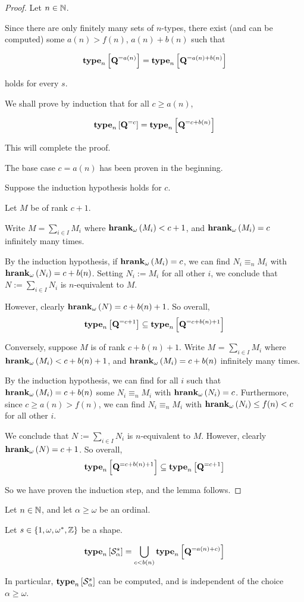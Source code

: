 \begin{proof}
  Let $n \in \mathbb{N}$.

  Since there are only finitely many sets of $n$-types,
  there exist (and can be computed)
  some $a(n) > f(n)$, $a(n) + b(n)$ such that

  \[\mathbf{type}_{n} \left[ {\mathbf{Q}^{= a(n)}} \right] = \mathbf{type}_{n} \left[ {\mathbf{Q}^{= a(n) + b(n)}} \right]\]

  holds for every $s$.

  We shall prove by induction that for all $c \ge a(n)$,

  \[\mathbf{type}_{n} \left[ {\mathbf{Q}^{= c}} \right] = \mathbf{type}_{n} \left[ {\mathbf{Q}^{= c + b(n)}} \right]\]

  This will complete the proof.

  The base case $c = a(n)$ has been proven in the beginning.

  Suppose the induction hypothesis holds for $c$.

  Let $M$ be of rank $c + 1$.

  Write $M = \sum_{i \in I} M_i$ where $\mathbf{hrank}_{\omega}\left( M_i \right) < c + 1$,
  and $\mathbf{hrank}_{\omega}\left( M_i \right) = c$ infinitely many times.

  By the induction hypothesis,
  if $\mathbf{hrank}_{\omega}\left( M_i \right) = c$, we can find $N_i \equiv_n M_i$ with $\mathbf{hrank}_{\omega}\left( N_i \right) = c + b(n)$.
  Setting $N_i := M_i$ for all other $i$, we conclude that $N := \sum_{i \in I} N_i$
  is $n$-equivalent to $M$.

  However, clearly $\mathbf{hrank}_{\omega}\left( N \right) = c + b(n) + 1$. So overall,
  \[\mathbf{type}_{n} \left[ {\mathbf{Q}^{= c + 1}} \right] \subseteq \mathbf{type}_{n} \left[ {\mathbf{Q}^{= c + b(n) + 1}} \right]\]

  Conversely, suppose $M$ is of rank $c + b(n) + 1$.
  Write $M$ = $\sum_{i \in I} M_i$ where $\mathbf{hrank}_{\omega}\left( M_i \right) < c + b(n) + 1$,
  and $\mathbf{hrank}_{\omega}\left( M_i \right) = c + b(n)$ infinitely many times.

  By the induction hypothesis,
  we can find for all $i$ such that $\mathbf{hrank}_{\omega}\left( M_i \right) = c + b(n)$ some
  $N_i \equiv_n M_i$ with $\mathbf{hrank}_{\omega}\left( N_i \right) = c$.
  Furthermore, since $c \ge a(n) > f(n)$, we can
  find $N_i \equiv_n M_i$ with $\mathbf{hrank}_{\omega}\left( N_i \right) \le f(n) < c$ for all other $i$.

  We conclude that $N := \sum_{i \in I} N_i$ is $n$-equivalent to $M$.
  However, clearly $\mathbf{hrank}_{\omega}\left( N \right) = c + 1$. So overall,
  \[\mathbf{type}_{n} \left[ {\mathbf{Q}^{= c + b(n) + 1}} \right] \subseteq \mathbf{type}_{n} \left[ {\mathbf{Q}^{= c + 1}} \right]\]

  So we have proven the induction step, and the lemma follows.
\end{proof}

\begin{lemma}
  Let $n \in \mathbb{N}$, and let $\alpha \ge \omega$ be an ordinal.

  Let $s \in \left\{ {1, \omega, \omega^\ast, \mathbb{Z}} \right\}$ be a shape.

  \[\mathbf{type}_{n} \left[ {\mathcal{S}^{s}_{\alpha}} \right] = \bigcup_{c < b(n)}{\mathbf{type}_{n} \left[ {\mathbf{Q}^{= a(n) + c)}} \right]}\]

  In particular, $\mathbf{type}_{n} \left[ {\mathcal{S}^{s}_{\alpha}} \right]$ can be
  computed, and is independent of the choice $\alpha \ge \omega$.
\end{lemma}

